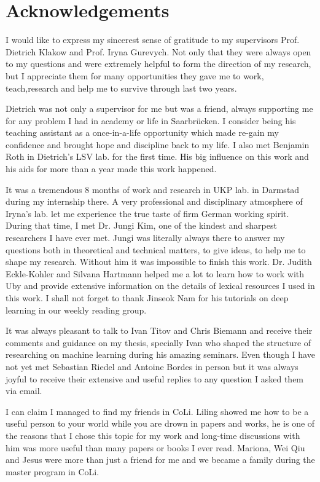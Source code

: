 \chapter*{Acknowledgements}
I would like to express my sincerest sense of gratitude to my supervisors Prof.
Dietrich Klakow and Prof. Iryna Gurevych. Not only that they were always open to
my questions and were extremely helpful to form the direction of my research,
but I appreciate them for many opportunities they gave me to work,
teach,research and help me to survive through last two years.

Dietrich was not only a supervisor for me but was a friend, always supporting me
for any problem I had in academy or life in Saarbr\"{u}cken. I consider being his
teaching assistant as a once-in-a-life opportunity which made re-gain my confidence and
brought hope and discipline back to my life. I also met Benjamin Roth in
Dietrich's LSV lab. for the first time. His big influence on this work and his
aids for more than a year made this work happened.

It was a tremendous 8 months of work and research in UKP lab.
in Darmstad during my internship there. A very professional and disciplinary
atmosphere of Iryna's lab. let me experience the true taste of firm German
working spirit. During that time, I met Dr. Jungi Kim, one of the kindest and
sharpest researchers I have ever met. Jungi was literally always there to answer
my questions both in theoretical and technical matters, to give ideas, to help
me to shape my research. Without him it was impossible to finish this work. Dr.
Judith Eckle-Kohler and Silvana Hartmann helped me a lot to learn how to work
with Uby and provide extensive information on the details of lexical resources I
used in this work. I shall not forget to thank Jinseok Nam for his tutorials on
deep learning in our weekly reading group.

It was always pleasant to talk to Ivan Titov and Chris Biemann
and receive their comments and guidance on my thesis, specially Ivan who shaped
the structure of researching on machine learning during his amazing seminars.
Even though I have not yet met Sebastian Riedel and Antoine Bordes in person but it was
always joyful to receive their extensive and useful replies to any question I
asked them via email.

I can claim I managed to find my friends in CoLi. Liling showed me how to be
a useful person to your world  while you are drown in papers and works, he is
one of the reasons that I chose this topic for my work and long-time discussions
with him was more useful than many papers or books I ever read. Mariona, Wei
Qiu and Jesus were more than just a friend for me and we became a family during
the master program in CoLi.

